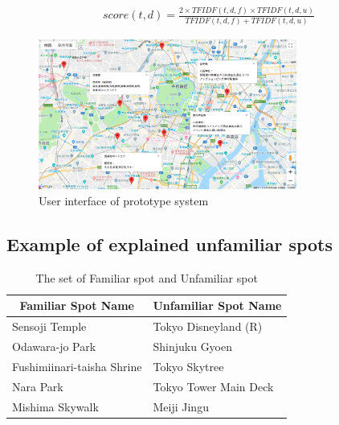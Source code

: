 \documentclass[journal]{IAENGtran}
\begin{document}
\begin{eqnarray}
  score(t,d) = \frac{2 \times TFIDF(t,d,f) \times TFIDF(t,d,u)}{TFIDF(t,d,f) + TFIDF(t,d,u)}
  \label{math:Harmonic Mean}
\end{eqnarray}

\begin{figure}[t]
  \begin{center}
    \includegraphics[clip,width=8.5cm,bb=0 0 1289 750]{picture/Photo_Map.png}
    \caption{User interface of prototype system}
    \label{fig:Photo_Map}
   \end{center}
\end{figure}

\subsection{Example of explained unfamiliar spots}
\label{subsec:Example of explained unfamiliar spots}

\begin{table}[t]
  \caption{The set of Familiar spot and Unfamiliar spot}
  \label{table:Familiar spot group and Unfamiliar spot group}
  \centering
  \begin{tabular}{l|l}
  \hline
  \multicolumn{1}{c|}{Familiar Spot Name} & \multicolumn{1}{c}{Unfamiliar Spot Name} \\ \hline
  Sensoji Temple                          & Tokyo Disneyland (R)                     \\
  Odawara-jo Park                         & Shinjuku Gyoen                           \\
  Fushimiinari-taisha Shrine              & Tokyo Skytree                            \\
  Nara Park                               & Tokyo Tower Main Deck            \\
  Mishima Skywalk                         & Meiji Jingu                              \\ \hline
  \end{tabular}
\end{table}
\end{document}

